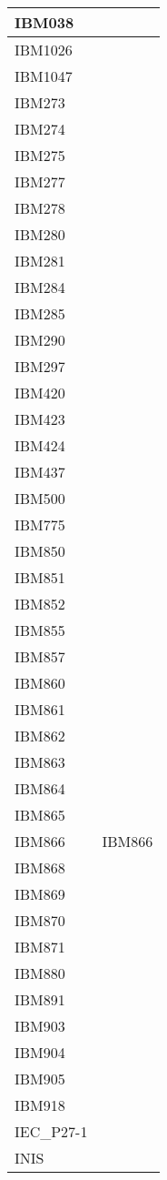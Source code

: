 \documentclass{wg21}
\begin{document}
\begin{longtable}{| p{} | p{} |}
IBM038 & \\ \hline
IBM1026 & \\ \hline
IBM1047 & \\ \hline
IBM273 & \\ \hline
IBM274 & \\ \hline
IBM275 & \\ \hline
IBM277 & \\ \hline
IBM278 & \\ \hline
IBM280 & \\ \hline
IBM281 & \\ \hline
IBM284 & \\ \hline
IBM285 & \\ \hline
IBM290 & \\ \hline
IBM297 & \\ \hline
IBM420 & \\ \hline
IBM423 & \\ \hline
IBM424 & \\ \hline
IBM437 & \\ \hline
IBM500 & \\ \hline
IBM775 & \\ \hline
IBM850 & \\ \hline
IBM851 & \\ \hline
IBM852 & \\ \hline
IBM855 & \\ \hline
IBM857 & \\ \hline
IBM860 & \\ \hline
IBM861 & \\ \hline
IBM862 & \\ \hline
IBM863 & \\ \hline
IBM864 & \\ \hline
IBM865 & \\ \hline
IBM866 & IBM866\\ \hline
IBM868 & \\ \hline
IBM869 & \\ \hline
IBM870 & \\ \hline
IBM871 & \\ \hline
IBM880 & \\ \hline
IBM891 & \\ \hline
IBM903 & \\ \hline
IBM904 & \\ \hline
IBM905 & \\ \hline
IBM918 & \\ \hline
IEC_P27-1 & \\ \hline
INIS & \\ \hline

\end{longtable}
\end{document}
